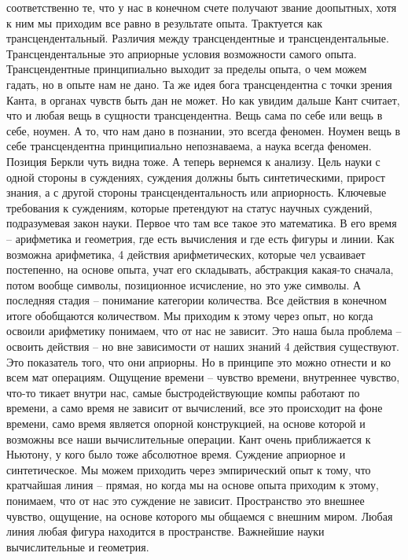 \documentclass[a4paper, 12pt]{article}
\begin{document}
соответственно те, что у нас в конечном счете получают звание доопытных, 
хотя к ним мы приходим все равно в результате опыта. Трактуется как 
трансцендентальный. Различия между трансцендентные и трансцендентальные. 
Трансцендентальные это априорные условия возможности самого опыта. 
Трансцендентные принципиально выходит за пределы опыта, о чем можем 
гадать, но в опыте нам не дано. Та же идея бога трансцендентна с точки 
зрения Канта, в органах чувств быть дан не может. Но как увидим дальше 
Кант считает, что и любая вещь в сущности трансцендентна. Вещь сама по 
себе или вещь в себе, ноумен. А то, что нам дано в познании, это всегда 
феномен. Ноумен вещь в себе трансцендентна принципиально непознаваема, 
а наука всегда феномен. Позиция Беркли чуть видна тоже. А теперь 
вернемся к анализу. Цель науки с одной стороны в суждениях, суждения 
должны быть синтетическими, прирост знания, а с другой стороны 
трансцендентальность или априорность. Ключевые требования к суждениям, 
которые претендуют на статус научных суждений, подразумевая закон науки. 
Первое что там все такое это математика. В его время -- арифметика 
и геометрия, где есть вычисления и где есть фигуры и линии. Как возможна 
арифметика, 4 действия арифметических, которые чел усваивает постепенно, 
на основе опыта, учат его складывать, абстракция какая-то сначала, потом 
вообще символы, позиционное исчисление, но это уже символы. А последняя 
стадия -- понимание категории количества. Все действия в конечном итоге 
обобщаются количеством. Мы приходим к этому через опыт, но когда освоили 
арифметику понимаем, что от нас не зависит. Это наша была проблема -- 
освоить действия -- но вне зависимости от наших знаний 4 действия 
существуют. Это показатель того, что они априорны. Но в принципе это 
можно отнести и ко всем мат операциям. Ощущение времени -- чувство 
времени, внутреннее чувство, что-то тикает внутри нас, самые 
быстродействующие компы работают по времени, а само время не зависит от 
вычислений, все это происходит на фоне времени, само время является 
опорной конструкцией, на основе которой и возможны все наши 
вычислительные операции. Кант очень приближается к Ньютону, у кого было 
тоже абсолютное время. Суждение априорное и синтетическое. Мы можем 
приходить через эмпирический опыт к тому, что кратчайшая линия -- 
прямая, но когда мы на основе опыта приходим к этому, понимаем, что от 
нас это суждение не зависит. Пространство это внешнее чувство, ощущение, 
на основе которого мы общаемся с внешним миром. Любая линия любая фигура 
находится в пространстве. Важнейшие науки вычислительные и геометрия. 
\end{document}
